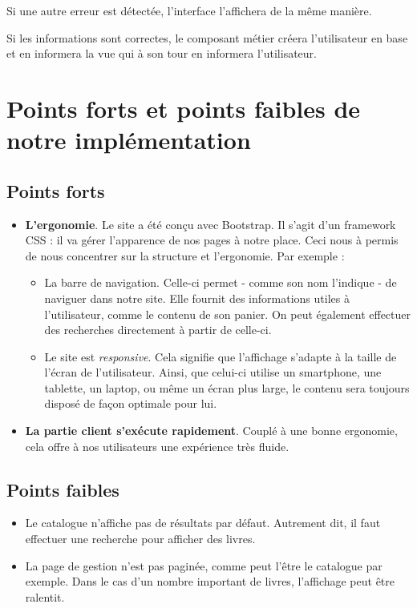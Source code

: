 	Si une autre erreur est détectée, l'interface l'affichera de la même manière.

	Si les informations sont correctes, le composant métier créera l'utilisateur en base et en informera la vue qui à son tour en informera l'utilisateur.

\section{Points forts et points faibles de notre implémentation}

	\subsection{Points forts}
	\begin{itemize}

		\item \textbf{L'ergonomie}. Le site a été conçu avec Bootstrap. Il s'agit d'un framework CSS : il va gérer l'apparence de nos pages à notre place. Ceci nous à permis de nous concentrer sur la structure et l'ergonomie. Par exemple :

		\begin{itemize}
			\item La barre de navigation. Celle-ci permet - comme son nom l'indique - de naviguer dans notre site. Elle fournit des informations utiles à l'utilisateur, comme le contenu de son panier. On peut également effectuer des recherches directement à partir de celle-ci.

			\item Le site est \emph{responsive}. Cela signifie que l'affichage s'adapte à la taille de l'écran de l'utilisateur. Ainsi, que celui-ci utilise un smartphone, une tablette, un laptop, ou même un écran plus large, le contenu sera toujours disposé de façon optimale pour lui.
		\end{itemize}

		\item \textbf{La partie client s'exécute rapidement}. Couplé à une bonne ergonomie, cela offre à nos utilisateurs une expérience très fluide.

	\end{itemize}


	\subsection{Points faibles}
	\begin{itemize}
		\item Le catalogue n'affiche pas de résultats par défaut. Autrement dit, il faut effectuer une recherche pour afficher des livres.

		\item La page de gestion n'est pas paginée, comme peut l'être le catalogue par exemple. Dans le cas d'un nombre important de livres, l'affichage peut être ralentit.
	\end{itemize}
